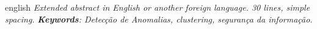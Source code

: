 \par
\begin{resumo}[Abstract]
\begin{otherlanguage*}{english}
\emph{
Extended abstract in English or another foreign language. 30 lines, simple spacing.
}
\vspace{\onelineskip}
\noindent
\emph{
\textbf{Keywords}: Detecção de Anomalias, clustering, segurança da informação.}
\end{otherlanguage*}
\end{resumo}
